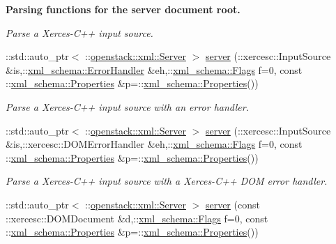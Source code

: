 \begin{Indent}{\bf Parsing functions for the server document root.}
\begin{DoxyCompactItemize}
\begin{DoxyCompactList}\small\item\em Parse a Xerces-\/C++ input source. \item\end{DoxyCompactList}\item 
::std::auto\_\-ptr$<$ ::\hyperlink{classopenstack_1_1xml_1_1Server}{openstack::xml::Server} $>$ \hyperlink{namespaceopenstack_1_1xml_abf14bd6e797a537162dd2034bcdc981f}{server} (::xercesc::InputSource \&is,::\hyperlink{namespacexml__schema_ab1c9361bfd3b404eaabf0c31eded79dc}{xml\_\-schema::ErrorHandler} \&eh,::\hyperlink{namespacexml__schema_affb4c227cbd9aa7453dd1dc5a1401943}{xml\_\-schema::Flags} f=0, const ::\hyperlink{namespacexml__schema_ad27ce19a7ee1d3b1064092648898f64c}{xml\_\-schema::Properties} \&p=::\hyperlink{namespacexml__schema_ad27ce19a7ee1d3b1064092648898f64c}{xml\_\-schema::Properties}())
\begin{DoxyCompactList}\small\item\em Parse a Xerces-\/C++ input source with an error handler. \item\end{DoxyCompactList}\item 
::std::auto\_\-ptr$<$ ::\hyperlink{classopenstack_1_1xml_1_1Server}{openstack::xml::Server} $>$ \hyperlink{namespaceopenstack_1_1xml_affc10980a198447f8d4f36334c8ecf4e}{server} (::xercesc::InputSource \&is,::xercesc::DOMErrorHandler \&eh,::\hyperlink{namespacexml__schema_affb4c227cbd9aa7453dd1dc5a1401943}{xml\_\-schema::Flags} f=0, const ::\hyperlink{namespacexml__schema_ad27ce19a7ee1d3b1064092648898f64c}{xml\_\-schema::Properties} \&p=::\hyperlink{namespacexml__schema_ad27ce19a7ee1d3b1064092648898f64c}{xml\_\-schema::Properties}())
\begin{DoxyCompactList}\small\item\em Parse a Xerces-\/C++ input source with a Xerces-\/C++ DOM error handler. \item\end{DoxyCompactList}\item 
::std::auto\_\-ptr$<$ ::\hyperlink{classopenstack_1_1xml_1_1Server}{openstack::xml::Server} $>$ \hyperlink{namespaceopenstack_1_1xml_abbc105655f7fe85bca8860da83cd6ebc}{server} (const ::xercesc::DOMDocument \&d,::\hyperlink{namespacexml__schema_affb4c227cbd9aa7453dd1dc5a1401943}{xml\_\-schema::Flags} f=0, const ::\hyperlink{namespacexml__schema_ad27ce19a7ee1d3b1064092648898f64c}{xml\_\-schema::Properties} \&p=::\hyperlink{namespacexml__schema_ad27ce19a7ee1d3b1064092648898f64c}{xml\_\-schema::Properties}())

\end{DoxyCompactItemize}
\end{Indent}
